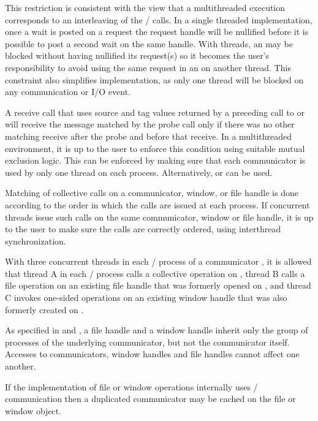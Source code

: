 \begin{rationale}
This restriction is consistent with the view that a multithreaded execution
corresponds to an interleaving of the \MPI/ calls.
In a single threaded implementation, once a wait is
posted on a request
the request handle will be nullified before it is possible to
post a second wait on the same handle.
%
%
%
%
With threads, an 
may be blocked without having nullified its request(s) so it
becomes the user's responsibility to avoid using the same request
in an  on another thread.
This constraint also simplifies
implementation, as only one thread will be blocked on any
communication or I/O event.
\end{rationale}

A receive call that uses source and tag values returned by a preceding
call to  or  will receive the
message matched by the probe call only if there was no other matching
receive
after the probe and before that receive.  In a multithreaded
environment, it is up to the user to enforce this condition using
suitable mutual exclusion logic.
This can be enforced by
making sure that each communicator is used by only one thread on each
process. Alternatively,
 or  can be used.

Matching of collective calls on a
communicator, window, or file handle is done according to the order in which the calls are issued
at each process.  If concurrent threads issue such calls on the same
communicator, window or file handle, it is up to
the user to make sure the calls are correctly ordered, using
interthread synchronization.
\begin{users}
  With three concurrent threads in each \MPI/ process of a communicator ,
  it is allowed that thread A in each \MPI/ process calls a collective
  operation on , thread B calls a file operation on an existing
  file handle that was formerly opened on , and thread C invokes one-sided
  operations on an existing window handle that was also formerly created
  on .
\end{users}
\begin{rationale}
  As specified in  and
  , a file handle and
  a window handle inherit only the group of processes of the underlying
  communicator, but not the communicator itself. Accesses to communicators,
  window handles and file handles cannot affect one another.
\end{rationale}
\begin{implementors}
  If the implementation of file or window operations internally
  uses \MPI/ communication then a duplicated communicator may be cached
  on the file or window object.
\end{implementors}

